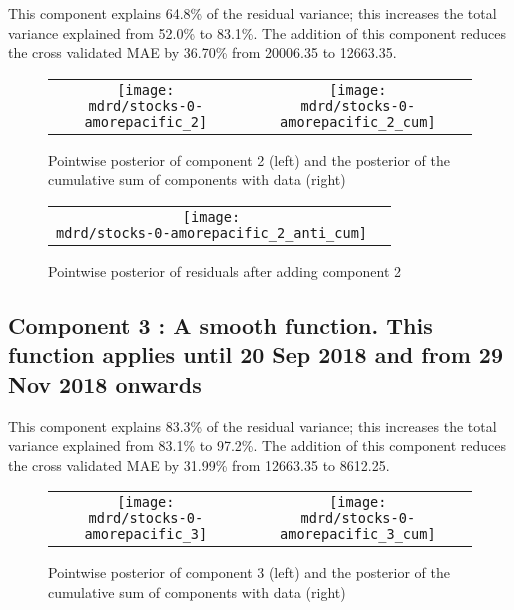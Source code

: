 \documentclass{article} %
\begin{document}


This component explains 64.8\% of the residual variance; this increases the total variance explained from 52.0\% to 83.1\%.
The addition of this component reduces the cross validated MAE by 36.70\% from 20006.35 to 12663.35.


\begin{figure}[H]
\newcommand{\wmgd}{0.5\columnwidth}
\newcommand{\hmgd}{3.0cm}
\newcommand{\mdrd}{stocks-0-amorepacific}
\newcommand{\mbm}{\hspace{-0.3cm}}
\begin{tabular}{cc}
\mbm \texttt{[image: \\mdrd/stocks-0-amorepacific\_2]} & \texttt{[image: \\mdrd/stocks-0-amorepacific\_2\_cum]}
\end{tabular}
\caption{Pointwise posterior of component 2 (left) and the posterior of the cumulative sum of components with data (right)}
\label{fig:comp2}
\end{figure}

\begin{figure}[H]
\newcommand{\wmgd}{0.5\columnwidth}
\newcommand{\hmgd}{3.0cm}
\newcommand{\mdrd}{stocks-0-amorepacific}
\newcommand{\mbm}{\hspace{-0.3cm}}
\begin{tabular}{cc}
\mbm \texttt{[image: \\mdrd/stocks-0-amorepacific\_2\_anti\_cum]}
\end{tabular}
\caption{Pointwise posterior of residuals after adding component 2}
\label{fig:comp2}
\end{figure}

\subsection{Component 3 : A smooth function. This function applies until 20 Sep 2018 and from 29 Nov 2018 onwards}



This component explains 83.3\% of the residual variance; this increases the total variance explained from 83.1\% to 97.2\%.
The addition of this component reduces the cross validated MAE by 31.99\% from 12663.35 to 8612.25.


\begin{figure}[H]
\newcommand{\wmgd}{0.5\columnwidth}
\newcommand{\hmgd}{3.0cm}
\newcommand{\mdrd}{stocks-0-amorepacific}
\newcommand{\mbm}{\hspace{-0.3cm}}
\begin{tabular}{cc}
\mbm \texttt{[image: \\mdrd/stocks-0-amorepacific\_3]} & \texttt{[image: \\mdrd/stocks-0-amorepacific\_3\_cum]}
\end{tabular}
\caption{Pointwise posterior of component 3 (left) and the posterior of the cumulative sum of components with data (right)}
\label{fig:comp3}
\end{figure}
\end{document}
